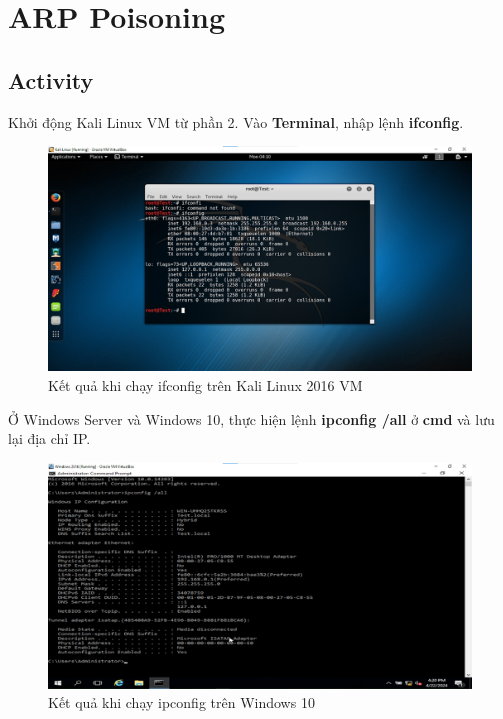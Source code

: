 \newpage

\section{ARP Poisoning}
\subsection{Activity}

 Khởi động Kali Linux VM từ phần 2. Vào \textbf{Terminal}, nhập lệnh \textbf{ifconfig}.

\begin{figure}[!htb]
    \centering
    \includegraphics[width=1\linewidth]{figure//chapter5//lab5_3/if-config_ver2.png}
    \caption{Kết quả khi chạy ifconfig trên Kali Linux 2016 VM}
    \label{fig:enter-label}
\end{figure}

 Ở Windows Server và Windows 10, thực hiện lệnh \textbf{ipconfig /all} ở \textbf{cmd} và lưu lại địa chỉ IP.

\begin{figure}[!htb]
    \centering
    \includegraphics[width=1\linewidth]{figure//chapter5//lab5_3/ipconfig_windows.png}
    \caption{Kết quả khi chạy ipconfig trên Windows 10}
    \label{fig:enter-label}
\end{figure}

